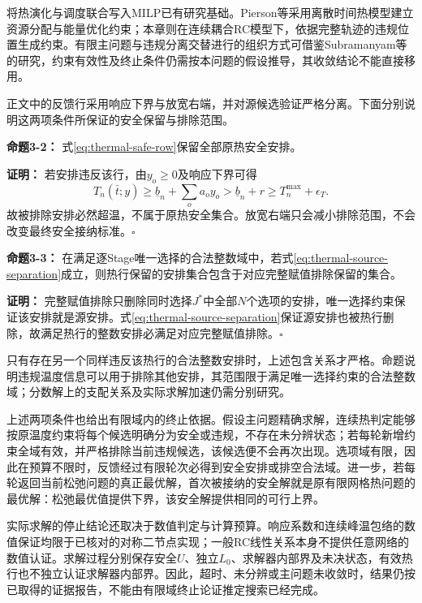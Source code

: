 将热演化与调度联合写入MILP已有研究基础。Pierson等采用离散时间热模型建立资源分配与能量优化约束\cite{pierson2020}；本章则在连续耦合RC模型下，依据完整轨迹的违规位置生成约束。有限主问题与违规分离交替进行的组织方式可借鉴Subramanyam等的研究\cite{subramanyam2020}，约束有效性及终止条件仍需按本问题的假设推导，其收敛结论不能直接移用。

正文中的反馈行采用响应下界与放宽右端，并对源候选验证严格分离。下面分别说明这两项条件所保证的安全保留与排除范围。

\noindent\begin{minipage}{\linewidth}
\setlength{\parindent}{2em}
\textbf{命题3-2：} 式\eqref{eq:thermal-safe-row}保留全部原热安全安排。

\textbf{证明：} 若安排违反该行，由\(y_o\ge0\)及响应下界可得
\begin{equation}
T_n(\bar t;y)\ge\underline b_n+\sum_o a_oy_o
>\underline b_n+r\ge T_n^{\max}+\epsilon_T.
\label{eq:thermal-row-validity}
\end{equation}
故被排除安排必然超温，不属于原热安全集合。放宽右端只会减小排除范围，不会改变最终安全接纳标准。\hfill$\square$
\end{minipage}\par\medskip

\textbf{命题3-3：} 在满足逐Stage唯一选择的合法整数域中，若式\eqref{eq:thermal-source-separation}成立，则热行保留的安排集合包含于对应完整赋值排除保留的集合。

\textbf{证明：} 完整赋值排除只删除同时选择\(J^*\)中全部\(N\)个选项的安排，唯一选择约束保证该安排就是源安排。式\eqref{eq:thermal-source-separation}保证源安排也被热行删除，故满足热行的整数安排必满足对应完整赋值排除。\hfill$\square$

只有存在另一个同样违反该热行的合法整数安排时，上述包含关系才严格。命题说明违规温度信息可以用于排除其他安排，其范围限于满足唯一选择约束的合法整数域；分数解上的支配关系及实际求解加速仍需分别研究。

上述两项条件也给出有限域内的终止依据。假设主问题精确求解，连续热判定能够按原温度约束将每个候选明确分为安全或违规，不存在未分辨状态；若每轮新增约束全域有效，并严格排除当前违规候选，该候选便不会再次出现。选项域有限，因此在预算不限时，反馈经过有限轮次必得到安全安排或排空合法域。进一步，若每轮返回当前松弛问题的真正最优解，首次被接纳的安全解就是原有限网格热问题的最优解：松弛最优值提供下界，该安全解提供相同的可行上界。

实际求解的停止结论还取决于数值判定与计算预算。响应系数和连续峰温包络的数值保证均限于已核对的对称二节点实现；一般RC线性关系本身不提供任意网络的数值认证。求解过程分别保存安全\(U\)、独立\(L_0\)、求解器内部界及未决状态，有效热行也不独立认证求解器内部界。因此，超时、未分辨或主问题未收敛时，结果仍按已取得的证据报告，不能由有限域终止论证推定搜索已经完成。


